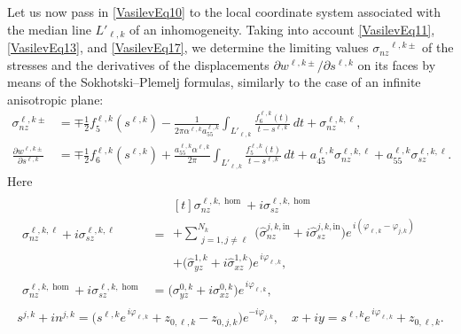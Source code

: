 Let us now pass in \eqref{VasilevEq10} to the local coordinate system associated with the median line $L'_{\ell,k}$ of an inhomogeneity. Taking into account \eqref{VasilevEq11}, \eqref{VasilevEq13}, and \eqref{VasilevEq17}, we determine the limiting values $\sigma_{nz}{}^{\ell,k\pm}$ of the stresses and the derivatives of the displacements $\partial w^{\ell,k\pm}/\partial s^{\ell,k}$ on its faces by means of the Sokhotski--Plemelj formulas, similarly to the case of an infinite anisotropic plane:
\begin{equation}
	\begin{aligned}
		\sigma_{nz}^{\ell,k\pm}
		&=
		\mp\frac{1}{2}f_{5}^{\ell,k}(s^{\ell,k})
		-\frac{1}{2\pi\alpha^{\ell,k}a_{55}^{\ell,k}}
		\int_{L'_{\ell,k}}\frac{f_{6}^{\ell,k}(t)}{t-s^{\ell,k}}\,dt
		+\sigma_{nz}^{\ell,k,\ell},
		\\
		\frac{\partial w^{\ell,k\pm}}{\partial s^{\ell,k}}
		&=
		\mp\frac{1}{2}f_{6}^{\ell,k}(s^{\ell,k})
		+\frac{a_{55}^{\ell,k}\alpha^{\ell,k}}{2\pi}
		\int_{L'_{\ell,k}}\frac{f_{5}^{\ell,k}(t)}{t-s^{\ell,k}}\,dt
		+a_{45}^{\ell,k}\sigma_{nz}^{\ell,k,\ell}
		+a_{55}^{\ell,k}\sigma_{sz}^{\ell,k,\ell}.
	\end{aligned}
	\label{VasilevEq18}
\end{equation}
%
Here
\[
\begin{array}{c}
\begin{aligned}
	\sigma_{nz}^{\ell,k,\ell}+i\sigma_{sz}^{\ell,k,\ell}
	&=
	\begin{multlined}[t]
	\sigma_{nz}^{\ell,k,\hom}+i\sigma_{sz}^{\ell,k,\hom}
	\\[-1.5em]
	+\sum_{\substack{j=1, j\ne \ell}}^{N_k}
	\bigl(
	\widehat{\sigma}_{nz}^{j,k,\mathrm{in}}
	+i\widehat{\sigma}_{sz}^{j,k,\mathrm{in}}
	\bigr)
	e^{\,i(\varphi_{\ell,k}-\varphi_{j,k})}
	\\
	+
	\bigl(
	\widehat{\sigma}_{yz}^{1,k}
	+i\widehat{\sigma}_{xz}^{1,k}
	\bigr)e^{\,i\varphi_{\ell,k}},
	\end{multlined}
	\\
	\sigma_{nz}^{\ell,k,\hom}+i\sigma_{sz}^{\ell,k,\hom}
	&=
	\bigl(
	\sigma_{yz}^{0,k}+i\sigma_{xz}^{0,k}
	\bigr)e^{\,i\varphi_{\ell,k}},
\end{aligned}
	\\[3.8em]
	s^{j,k}+in^{j,k}
	=
	\bigl(
	s^{\ell,k}e^{\,i\varphi_{\ell,k}}
	+z_{0,\ell,k}-z_{0,j,k}
	\bigr)e^{-i\varphi_{j,k}},
	\quad
	x+iy
	=
	s^{\ell,k}e^{\,i\varphi_{\ell,k}}+z_{0,\ell,k}.
\end{array}
\]


